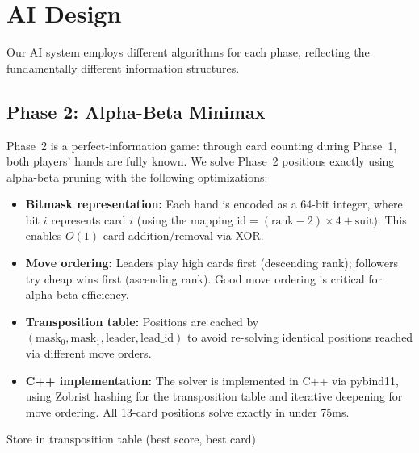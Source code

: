 \section{AI Design}
\label{sec:ai}

Our AI system employs different algorithms for each phase, reflecting the
fundamentally different information structures.

\subsection{Phase 2: Alpha-Beta Minimax}

Phase~2 is a perfect-information game: through card counting during Phase~1,
both players' hands are fully known. We solve Phase~2 positions exactly using
alpha-beta pruning with the following optimizations:

\begin{itemize}
  \item \textbf{Bitmask representation:} Each hand is encoded as a 64-bit
    integer, where bit $i$ represents card $i$ (using the mapping
    $\text{id} = (\text{rank} - 2) \times 4 + \text{suit}$). This enables
    $O(1)$ card addition/removal via XOR.
  \item \textbf{Move ordering:} Leaders play high cards first (descending
    rank); followers try cheap wins first (ascending rank). Good move ordering
    is critical for alpha-beta efficiency.
  \item \textbf{Transposition table:} Positions are cached by
    $(\text{mask}_0, \text{mask}_1, \text{leader}, \text{lead\_id})$ to avoid
    re-solving identical positions reached via different move orders.
  \item \textbf{C++ implementation:} The solver is implemented in C++ via
    pybind11, using Zobrist hashing for the transposition table and iterative
    deepening for move ordering. All 13-card positions solve exactly in
    under 75ms.
\end{itemize}

\begin{algorithm}[H]
\caption{Alpha-Beta Minimax for Phase 2}
Store in transposition table\;
\Return (best score, best card)
\end{algorithm}

